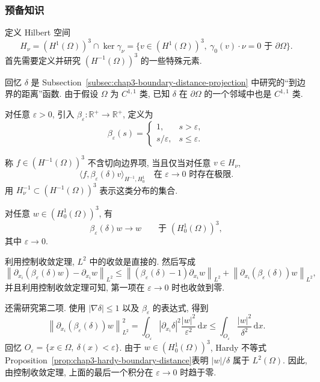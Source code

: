 \subsubsection{预备知识}
\label{subsec:chap4-vorticity-preliminaries}

定义 Hilbert 空间
\[
 H_\nu=(H^1(\Omega))^3\cap\ker\gamma_\nu
 =\{v\in(H^1(\Omega))^3,\ \gamma_0(v)\cdot\nu=0\text{ 于 }\partial\Omega\}.
\]
首先需要定义并研究 $(H^{-1}(\Omega))^3$ 的一些特殊元素.

回忆 $\delta$ 是 Subsection~\ref{subsec:chap3-boundary-distance-projection} 中研究的“到边界的距离”函数. 由于假设 $\Omega$ 为 $C^{1,1}$ 类, 已知 $\delta$ 在 $\partial\Omega$ 的一个邻域中也是 $C^{1,1}$ 类.

对任意 $\varepsilon>0$, 引入 $\beta_\varepsilon:\mathbb R^+\to\mathbb R^+$, 定义为
\[
 \beta_\varepsilon(s)=
 \begin{cases}
  1,&s>\varepsilon,\\
  s/\varepsilon,&s\leq\varepsilon.
 \end{cases}
\]

\begin{Definition}
\label{def:chap4-no-tangential-boundary-terms}
称 $f\in(H^{-1}(\Omega))^3$ 不含切向边界项, 当且仅当对任意 $v\in H_\nu$,
\begin{equation}
 \bigl\langle f,\beta_\varepsilon(\delta)v\bigr\rangle_{H^{-1},H_0^1}
 \quad\text{在 }\varepsilon\to0\text{ 时存在极限}.
 \label{eq:chap4-no-tangential-boundary-terms}
\end{equation}
用 $H_\nu^{-1}\subset(H^{-1}(\Omega))^3$ 表示这类分布的集合.
\end{Definition}

\begin{Lemma}
\label{lem:chap4-boundary-cutoff-convergence}
对任意 $w\in(H_0^1(\Omega))^3$, 有
\[
 \beta_\varepsilon(\delta)w\longrightarrow w
 \qquad\text{于 }(H_0^1(\Omega))^3,
\]
其中 $\varepsilon\to0$.
\end{Lemma}

\begin{Proof}
利用控制收敛定理, $L^2$ 中的收敛是直接的. 然后写成
\[
 \left\|\partial_{x_i}(\beta_\varepsilon(\delta)w)-\partial_{x_i}w\right\|_{L^2}
 \leq\left\|(\beta_\varepsilon(\delta)-1)\partial_{x_i}w\right\|_{L^2}
 +\left\|\partial_{x_i}(\beta_\varepsilon(\delta))w\right\|_{L^2},
\]
并且利用控制收敛定理可知, 第一项在 $\varepsilon\to0$ 时也收敛到零.

还需研究第二项. 使用 $|\nabla\delta|\leq1$ 以及 $\beta_\varepsilon$ 的表达式, 得到
\[
 \left\|\partial_{x_i}(\beta_\varepsilon(\delta))w\right\|_{L^2}^2
 =\int_{O_\varepsilon}|\partial_{x_i}\delta|^2\frac{|w|^2}{\varepsilon^2}\,\mathrm dx
 \leq\int_{O_\varepsilon}\frac{|w|^2}{\delta^2}\,\mathrm dx.
\]
回忆 $O_\varepsilon=\{x\in\Omega,\ \delta(x)<\varepsilon\}$. 由于 $w\in(H_0^1(\Omega))^3$, Hardy 不等式 Proposition~\ref{prop:chap3-hardy-boundary-distance}表明 $|w|/\delta$ 属于 $L^2(\Omega)$. 因此, 由控制收敛定理, 上面的最后一个积分在 $\varepsilon\to0$ 时趋于零.
\end{Proof}

